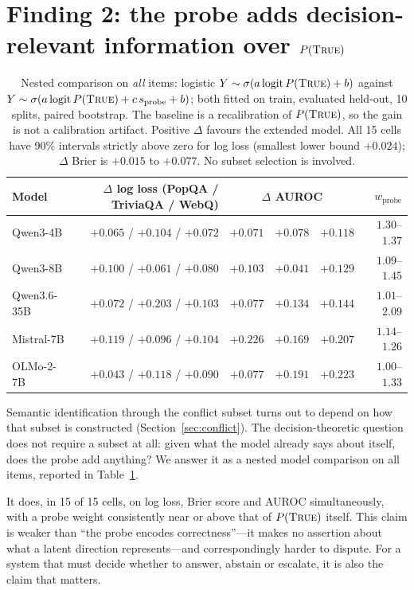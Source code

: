 \documentclass[10pt]{article}
\newcommand{\ptrue}{P(\textsc{True})}
\begin{document}
\section{Finding 2: the probe adds decision-relevant information over $\ptrue{}$}
\label{sec:incremental}

\begin{table}[t]
\centering\small
\begin{tabular}{lrrrrr}
\toprule
Model & $\Delta$ log loss (PopQA / TriviaQA / WebQ) & \multicolumn{3}{c}{$\Delta$ AUROC} & $w_{\text{probe}}$ \\
\midrule
Qwen3-4B    & $+0.065$ \; / \; $+0.104$ \; / \; $+0.072$ & $+0.071$ & $+0.078$ & $+0.118$ & $1.30$--$1.37$ \\
Qwen3-8B    & $+0.100$ \; / \; $+0.061$ \; / \; $+0.080$ & $+0.103$ & $+0.041$ & $+0.129$ & $1.09$--$1.45$ \\
Qwen3.6-35B & $+0.072$ \; / \; $+0.203$ \; / \; $+0.103$ & $+0.077$ & $+0.134$ & $+0.144$ & $1.01$--$2.09$ \\
Mistral-7B  & $+0.119$ \; / \; $+0.096$ \; / \; $+0.104$ & $+0.226$ & $+0.169$ & $+0.207$ & $1.14$--$1.26$ \\
OLMo-2-7B   & $+0.043$ \; / \; $+0.118$ \; / \; $+0.090$ & $+0.077$ & $+0.191$ & $+0.223$ & $1.00$--$1.33$ \\
\bottomrule
\end{tabular}
\caption{Nested comparison on \emph{all} items: logistic
$Y \sim \sigma(a \operatorname{logit}\ptrue{} + b)$ against
$Y \sim \sigma(a \operatorname{logit}\ptrue{} + c\,s_{\text{probe}} + b)$; both fitted on
train, evaluated held-out, 10 splits, paired bootstrap. The baseline is a recalibration of
$\ptrue{}$, so the gain is not a calibration artifact. Positive $\Delta$ favours the extended model. All 15 cells have 90\% intervals
strictly above zero for log loss (smallest lower bound $+0.024$); $\Delta$ Brier is
$+0.015$ to $+0.077$. No subset selection is involved.}
\label{tab:incremental}
\end{table}

Semantic identification through the conflict subset turns out to depend on how that subset is
constructed (Section~\ref{sec:conflict}). The decision-theoretic question does not require a subset
at all: given what the model already says about itself, does the probe add anything? We answer it as
a nested model comparison on all items, reported in Table~\ref{tab:incremental}.

It does, in 15 of 15 cells, on log loss, Brier score and AUROC simultaneously, with a probe weight
consistently near or above that of $\ptrue{}$ itself. This claim is weaker than ``the probe encodes
correctness''---it makes no assertion about what a latent direction represents---and correspondingly
harder to dispute. For a system that must decide whether to answer, abstain or escalate, it is also
the claim that matters.
\end{document}
